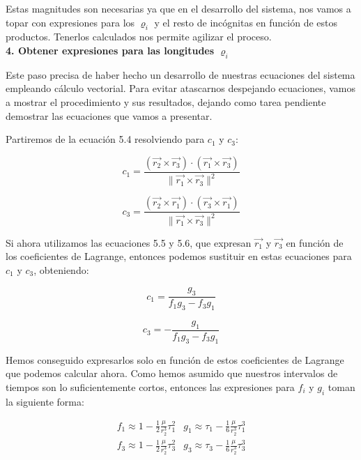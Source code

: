 \documentclass{article}
\numberwithin{equation}{section}
\begin{document}
Estas magnitudes son necesarias ya que en el desarrollo del sistema, nos vamos a topar con expresiones para los $\varrho_i$ y el resto de incógnitas en función de estos productos. Tenerlos calculados nos permite agilizar el proceso.\\

\noindent\textbf{4. Obtener expresiones para las longitudes $\varrho_i$}

Este paso precisa de haber hecho un desarrollo de nuestras ecuaciones del sistema empleando cálculo vectorial. Para evitar atascarnos despejando ecuaciones, vamos a mostrar el procedimiento y sus resultados, dejando como tarea pendiente demostrar las ecuaciones que vamos a presentar.\par

Partiremos de la ecuación 5.4 resolviendo para $c_1$ y $c_3$:

\begin{equation}
    c_1 = \frac{(\overrightarrow{r_2} \times \overrightarrow{r_3}) \cdot (\overrightarrow{r_1} \times \overrightarrow{r_3})}{\|\overrightarrow{r_1} \times \overrightarrow{r_3}\|^2}
\end{equation}

\begin{equation}
    c_3 = \frac{(\overrightarrow{r_2} \times \overrightarrow{r_1}) \cdot (\overrightarrow{r_3} \times \overrightarrow{r_1})}{\|\overrightarrow{r_1} \times \overrightarrow{r_3}\|^2}
\end{equation}

Si ahora utilizamos las ecuaciones 5.5 y 5.6, que expresan $\overrightarrow{r_1}$ y $\overrightarrow{r_3}$ en función de los coeficientes de Lagrange, entonces podemos sustituir en estas ecuaciones para $c_1$ y $c_3$, obteniendo:

\begin{equation}
c_1 = \frac{g_3}{f_{1}g_3 - f_{3}g_1}
\end{equation}

\begin{equation}
c_3 = -\frac{g_1}{f_{1}g_3 - f_{3}g_1}
\end{equation}

Hemos conseguido expresarlos solo en función de estos coeficientes de Lagrange que podemos calcular ahora. Como hemos asumido que nuestros intervalos de tiempos son lo suficientemente cortos, entonces las expresiones para $f_i$ y $g_i$ toman la siguiente forma:

\begin{equation}
\begin{array}{cc}
f_1 \approx 1 - \frac{1}{2} \frac{\mu}{r_2^3} \tau_1^2 & g_1 \approx \tau_1 - \frac{1}{6} \frac{\mu}{r_2^3} \tau_1^3 \\[1.5em]
f_3 \approx 1 - \frac{1}{2} \frac{\mu}{r_2^3} \tau_3^2 & g_3 \approx \tau_3 - \frac{1}{6} \frac{\mu}{r_2^3} \tau_3^3
\end{array}
\end{equation}
\end{document}

